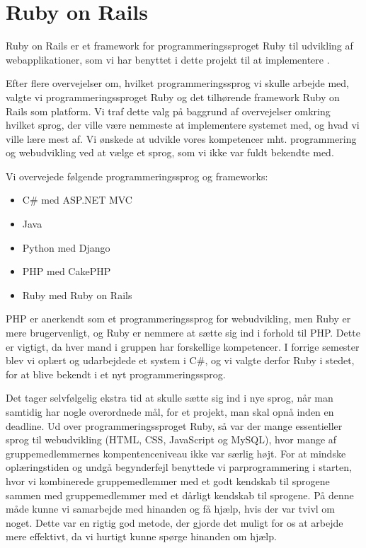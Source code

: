 \chapter{Ruby on Rails}
\label{akademiskror}

Ruby on Rails er et framework for programmeringssproget Ruby til udvikling af webapplikationer, som vi har benyttet i dette projekt til at implementere {\Foodl}.

Efter flere overvejelser om, hvilket programmeringssprog vi skulle arbejde med, valgte vi programmeringssproget Ruby og det tilhørende framework Ruby on Rails som platform. Vi traf dette valg på baggrund af overvejelser omkring hvilket sprog, der ville være nemmeste at implementere systemet med, og hvad vi ville lære mest af. Vi ønskede at udvikle vores kompetencer mht. programmering og webudvikling ved at vælge et sprog, som vi ikke var fuldt bekendte med. 

Vi overvejede følgende programmeringssprog og frameworks:

\begin{itemize}[noitemsep]
\item C\# med ASP.NET MVC
\item Java
\item Python med Django
\item PHP med CakePHP
\item Ruby med Ruby on Rails
\end{itemize}

PHP er anerkendt som et programmeringssprog for webudvikling, men Ruby er mere brugervenligt, og Ruby er nemmere at sætte sig ind i forhold til PHP. Dette er vigtigt, da hver mand i gruppen har forskellige kompetencer. I forrige semester blev vi oplært og udarbejdede et system i C\#, og vi valgte derfor Ruby i stedet, for at blive bekendt i et nyt programmeringssprog.

Det tager selvfølgelig ekstra tid at skulle sætte sig ind i nye sprog, når man samtidig har nogle overordnede mål, for et projekt, man skal opnå inden en deadline. Ud over programmeringssproget Ruby, så var der mange essentieller sprog til webudvikling (HTML, CSS, JavaScript og MySQL), hvor mange af gruppemedlemmernes kompentenceniveau ikke var særlig højt. For at mindske oplæringstiden og undgå begynderfejl benyttede vi parprogrammering i starten, hvor vi kombinerede gruppemedlemmer med et godt kendskab til sprogene sammen med gruppemedlemmer med et dårligt kendskab til sprogene. På denne måde kunne vi samarbejde med hinanden og få hjælp, hvis der var tvivl om noget. Dette var en rigtig god metode, der gjorde det muligt for os at arbejde mere effektivt, da vi hurtigt kunne spørge hinanden om hjælp.

